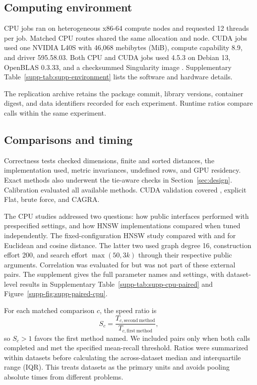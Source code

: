 \documentclass[article]{jss}
\newcommand{\method}[1]{\code{#1}}
\begin{document}
\subsection{Computing environment}
\label{sec:computing-environment}

CPU jobs ran on heterogeneous x86-64 compute nodes and requested 12 threads
per job. Matched CPU routes shared the same allocation and node. CUDA jobs used
one NVIDIA L40S with 46,068 mebibytes (MiB), compute capability 8.9, and driver
595.58.03. Both CPU and CUDA jobs used  4.5.3 on Debian 13,
OpenBLAS 0.3.33, and a checksummed Singularity image \citep{Singularity}.
Supplementary
Table~\ref{supp-tab:supp-environment}
lists the software and hardware details.

The replication archive retains the package commit, library versions,
container digest, and data identifiers recorded for each experiment. Runtime
ratios compare calls within the same experiment.

\subsection{Comparisons and timing}

Correctness tests checked dimensions, finite and sorted distances, the
implementation used, metric invariances, undefined rows, and GPU residency.
Exact methods also underwent the tie-aware checks in Section~\ref{sec:design}.
Calibration evaluated all available methods. CUDA validation covered
\method{auto}, explicit Flat, brute force, and CAGRA.

The CPU studies addressed two questions: how public interfaces performed with
prespecified settings, and how HNSW implementations compared when tuned
independently. The fixed-configuration HNSW study compared  with
 and  for Euclidean and cosine distance.
The latter two used graph degree 16, construction effort 200, and search
effort $\max(50,3k)$ through their respective public arguments. Correlation
was evaluated for  but was not part of these external pairs.
The supplement gives the full parameter names and settings, with dataset-level
results in Supplementary Table~\ref{supp-tab:supp-cpu-paired} and
Figure~\ref{supp-fig:supp-paired-cpu}.

For each matched comparison $c$, the speed ratio is
\begin{equation}
S_c=\frac{T_{c,\mathrm{second\ method}}}{T_{c,\mathrm{first\ method}}},
\label{eq:speed-ratio}
\end{equation}
so $S_c>1$ favors the first method named. We included pairs only when both
calls completed and met the specified mean-recall threshold. Ratios were
summarized within datasets before calculating the across-dataset median and
interquartile range (IQR). This treats datasets as the primary units and
avoids pooling absolute times from different problems.
\end{document}
